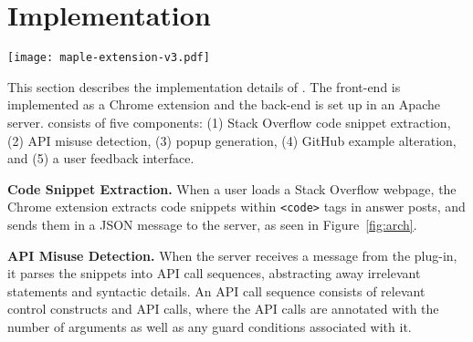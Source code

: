 \section{Implementation}
\label{sec:implementation}

\begin{figure*}[!th]
\centering
\texttt{[image: maple-extension-v3.pdf]}
\vspace{.1in}
\caption{An overview of {\soa}'s architecture}
\label{fig:arch}
\end{figure*}

This section describes the implementation details of {\soa}. The front-end is implemented as a Chrome extension and the back-end is set up in an Apache server. {\soa} consists of five components: (1) Stack Overflow code snippet extraction, (2) API misuse detection, (3) popup generation, (4) GitHub example alteration, and (5) a user feedback interface.

{\bf Code Snippet Extraction.} When a user loads a Stack Overflow webpage, the Chrome extension extracts code snippets within {\tt <code>} tags in answer posts, and sends them in a JSON message to the server, as seen in Figure~\ref{fig:arch}.

{\bf API Misuse Detection.} When the server receives a message from the plug-in, it parses the snippets into API call sequences, abstracting away irrelevant statements and syntactic details. An API call sequence consists of relevant control constructs and API calls, where the API calls are annotated with the number of arguments as well as any guard conditions associated with it.

